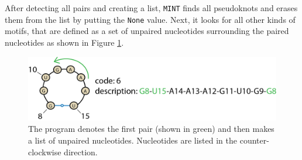 \documentclass[12pt]{article}
\begin{document}
After detecting all pairs and creating a list, {\tt MINT} finds all pseudoknots and erases them from the list by putting the {\tt None} value. Next, it looks for all other kinds of motifs, that are defined as a set of unpaired nucleotides surrounding the paired nucleotides as shown in Figure \ref{MotifDesc}.

\begin{figure}[h!]
\centering
\includegraphics[width = \textwidth]{./pictures/motifs_description.png}
\caption{The program denotes the first pair (shown in green) and then makes a list of unpaired nucleotides. Nucleotides are listed in the counter-clockwise direction.}
\label{MotifDesc}
\end{figure}
\end{document}
